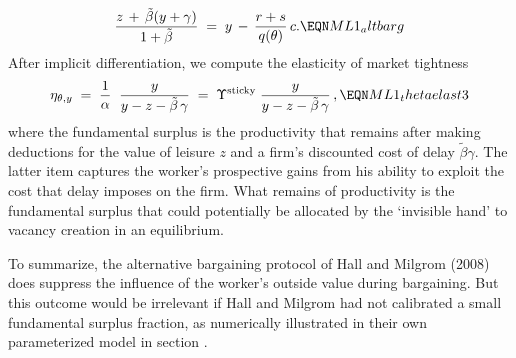 $$
{ z\,+\,\tilde \beta(y+\gamma) \over 1+\tilde \beta }  \;=\;
y \,-\, {r + s \over q(\theta)} \, c .       \EQN ML1_altbarg
$$
After implicit differentiation,
we compute the elasticity of market tightness 
$$
\eta_{\theta,y}
\;=\; {1 \over \alpha} \; \;
      {y \over y-z- \tilde \beta \,\gamma}
\;=\; \Upsilon^{\rm sticky}\;
         {y \over y-z- \tilde \beta \,\gamma}\,,  \EQN ML1_thetaelast3
$$
where the fundamental surplus is the productivity
that remains after making deductions for the value of leisure $z$
and a firm's discounted cost of delay $\tilde \beta \gamma$.
The latter item
captures the worker's prospective gains from his
 ability to exploit the
cost that delay imposes on the firm.  What remains of productivity is the
fundamental surplus that could potentially be allocated by the
`invisible hand'  to  vacancy creation in an equilibrium.

To summarize, the alternative bargaining
protocol of Hall and Milgrom (2008) does suppress the influence of the
worker's outside value during bargaining. But
this outcome would be irrelevant if  Hall and Milgrom had  not
calibrated a small fundamental surplus fraction, as numerically
illustrated in their own parameterized model in section
.



